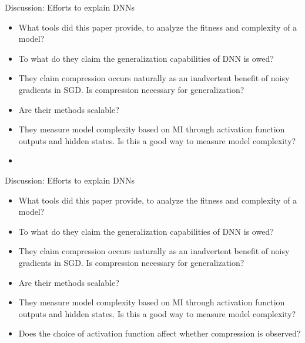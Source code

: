 \documentclass[aspectratio=169,11pt]{beamer}
\begin{document}
\begin{frame}{Discussion: Efforts to explain DNNs}

\begin{itemize}
    \item What tools did this paper provide, to analyze the fitness and complexity of a model?
    \item To what do they claim the generalization capabilities of DNN is owed?
    \item They claim compression occurs naturally as an inadvertent benefit of noisy gradients in SGD. Is compression necessary for generalization?
    \item Are their methods scalable?
    \item They measure model complexity based on MI through activation function outputs and hidden states. Is this a good way to measure model complexity?
    \item[-]
\end{itemize}

\end{frame}

\begin{frame}{Discussion: Efforts to explain DNNs}

\begin{itemize}
    \item What tools did this paper provide, to analyze the fitness and complexity of a model?
    \item To what do they claim the generalization capabilities of DNN is owed?
    \item They claim compression occurs naturally as an inadvertent benefit of noisy gradients in SGD. Is compression necessary for generalization?
    \item Are their methods scalable?
    \item They measure model complexity based on MI through activation function outputs and hidden states. Is this a good way to measure model complexity?
    \item Does the choice of activation function affect whether compression is observed?
\end{itemize}

\end{frame}
\end{document}

